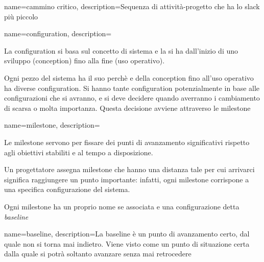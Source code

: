 {
name=cammino critico,
description={Sequenza di attivit\`a-progetto che ha lo slack pi\`u piccolo}
}

{
name=configuration,
description={La configuration si basa sul concetto di sistema e la si ha dall'inizio di uno sviluppo (conception) fino alla fine (uso operativo).

Ogni pezzo del sistema ha il suo perch\`e e della conception fino all'uso operativo ha diverse configuration. Si hanno tante configuration  potenzialmente in base alle configurazioni che si avranno, e si deve decidere quando averranno i cambiamento di scarsa o molta importanza. Questa decisione avviene attraverso le milestone}
}

{
name=milestone,
description={Le milestone servono per fissare dei punti di avanzamento significativi rispetto agli obiettivi stabiliti e al tempo a disposizione.

Un progettatore assegna milestone che hanno una distanza tale per cui arrivarci significa raggiungere un punto importante: infatti, ogni milestone corrispone a una specifica configurazione del sistema.

Ogni milestone ha un proprio nome se associata e una configurazione detta \textit{baseline}}
}

{
name=baseline,
description={La baseline \`e un punto di avanzamento certo, dal quale non si torna mai indietro. Viene visto come un punto di situazione certa dalla quale si potr\`a soltanto avanzare senza mai retrocedere}
}

